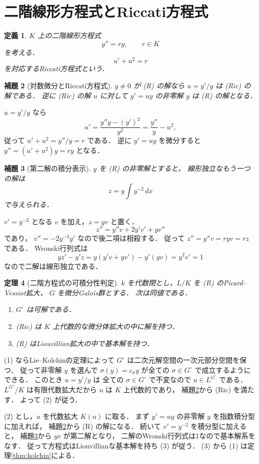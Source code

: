 \documentclass[a5paper,10pt,onecolumn]{jsarticle}
\makeatletter
\theoremstyle{mathnotetheorem}
\newtheorem{theorem}{定理}[section]
\newtheorem{definition}[theorem]{定義}
\newtheorem{lemma}[theorem]{補題}
\renewcommand{\proofname}{証明}
\renewenvironment{proof}[1][\proofname]{%
  \par\pushQED{\qed}\normalfont\topsep4\p@\@plus2\p@\relax
  \trivlist\item[\hskip\labelsep\bfseries #1]\ignorespaces
}{\popQED\endtrivlist\@endpefalse}
\makeatother
\begin{document}
\section{二階線形方程式とRiccati方程式}

\begin{definition}
$K$ 上の二階線形方程式
\[
 y''=r y,\qquad r\in K
 \tag{R}
\]
を考える．
\[
 u'+u^2=r
 \tag{Ric}
\]
を対応するRiccati方程式という．
\end{definition}

\begin{lemma}[対数微分とRiccati方程式]
\label{lem:riccati-reduction}
$y\ne0$ が (R) の解なら $u=y'/y$ は (Ric) の解である．
逆に (Ric) の解 $u$ に対して
$y'=uy$ の非零解 $y$ は (R) の解となる．
\end{lemma}
\begin{proof}
$u=y'/y$ なら
\[
 u'=\frac{y''y-(y')^2}{y^2}
 =\frac{y''}{y}-u^2,
\]
従って $u'+u^2=y''/y=r$ である．
逆に $y'=uy$ を微分すると
$y''=(u'+u^2)y=ry$ となる．
\end{proof}

\begin{lemma}[第二解の積分表示]\label{lem:second-solution}
$y$ を (R) の非零解とすると，
線形独立なもう一つの解は
\[
 z=y\int y^{-2}\,dx
\]
で与えられる．
\end{lemma}
\begin{proof}
$v' =y^{-2}$ となる $v$ を加え，$z=yv$ と置く．
\[
 z''=y''v+2y'v'+yv''
\]
であり，
$v''=-2y^{-3}y'$ なので後二項は相殺する．
従って $z''=y''v=ryv=rz$ である．
Wronski行列式は
\[
 yz'-y'z=y(y'v+yv')-y'(yv)=y^2v'=1
\]
なので二解は線形独立である．
\end{proof}

\begin{theorem}[二階方程式の可積分性判定]
\label{thm:riccati-criterion}
$k$ を代数閉とし，$L/K$ を (R) のPicard--Vessiot拡大，
$G$ を微分Galois群とする．
次は同値である．
\begin{enumerate}
\item $G^\circ$ は可解である．
\item (Ric) は $K$ 上代数的な微分体拡大の中に解を持つ．
\item (R) はLiouvillian拡大の中で基本解を持つ．
\end{enumerate}
\end{theorem}
\begin{proof}
(1) ならLie--Kolchinの定理によって
$G^\circ$ は二次元解空間の一次元部分空間を保つ．
従って非零解 $y$ を選んで
$\sigma(y)=c_\sigma y$ が全ての $\sigma\in G^\circ$
で成立するようにできる．
このとき $u=y'/y$ は
全ての $\sigma\in G^\circ$ で不変なので
$u\in L^{G^\circ}$ である．
$L^{G^\circ}/K$ は有限代数拡大だから
$u$ は $K$ 上代数的であり，
補題\ref{lem:riccati-reduction}から (Ric) を満たす．
よって (2) が従う．

(2) とし，$u$ を代数拡大 $K(u)$ に取る．
まず $y'=uy$ の非零解 $y$ を指数積分型に加えれば，
補題\ref{lem:riccati-reduction}から (R) の解になる．
続いて $v'=y^{-2}$ を積分型に加えると，
補題\ref{lem:second-solution}から $yv$ が第二解となり，
二解のWronski行列式は1なので基本解系をなす．
従って方程式はLiouvillianな基本解を持ち (3) が従う．
(3) から (1) は定理\ref{thm:kolchin}による．
\end{proof}
\end{document}
